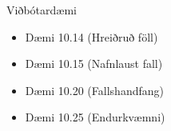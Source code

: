 \documentclass[handout]{beamer}
\begin{document}
\begin{frame}{Viðbótardæmi}
    \begin{itemize}
        \item Dæmi 10.14 (Hreiðruð föll)
		\item Dæmi 10.15 (Nafnlaust fall)
		\item Dæmi 10.20 (Fallshandfang)
		\item Dæmi 10.25 (Endurkvæmni)
    \end{itemize}
\end{frame}
\end{document}
